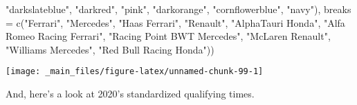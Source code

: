 \documentclass[
]{book}
\newenvironment{Shaded}{\begin{snugshade}}{\end{snugshade}}
\newcommand{\AttributeTok}[1]{\textcolor[rgb]{0.77,0.63,0.00}{#1}}
\newcommand{\FunctionTok}[1]{\textcolor[rgb]{0.00,0.00,0.00}{#1}}
\newcommand{\NormalTok}[1]{#1}
\newcommand{\StringTok}[1]{\textcolor[rgb]{0.31,0.60,0.02}{#1}}
\begin{document}
\begin{Shaded}
\begin{Highlighting}[]
                               \StringTok{"darkslateblue"}\NormalTok{, }
                                \StringTok{"darkred"}\NormalTok{,  }
                                \StringTok{"pink"}\NormalTok{, }
                                \StringTok{"darkorange"}\NormalTok{, }
                                \StringTok{"cornflowerblue"}\NormalTok{,}
                               \StringTok{"navy"}\NormalTok{),}
                     \AttributeTok{breaks =} \FunctionTok{c}\NormalTok{(}\StringTok{"Ferrari"}\NormalTok{,}
                                 \StringTok{"Mercedes"}\NormalTok{,}
                                 \StringTok{"Haas Ferrari"}\NormalTok{,}
                                 \StringTok{"Renault"}\NormalTok{,}
                                 \StringTok{"AlphaTauri Honda"}\NormalTok{,}
                                 \StringTok{"Alfa Romeo Racing Ferrari"}\NormalTok{, }
                                 \StringTok{"Racing Point BWT Mercedes"}\NormalTok{,}
                                 \StringTok{"McLaren Renault"}\NormalTok{,}
                                 \StringTok{"Williams Mercedes"}\NormalTok{,}
                                 \StringTok{"Red Bull Racing Honda"}\NormalTok{))}
\end{Highlighting}
\end{Shaded}

\begin{center}\texttt{[image: \_main\_files/figure-latex/unnamed-chunk-99-1]} \end{center}

And, here's a look at 2020's standardized qualifying times.
\end{document}
